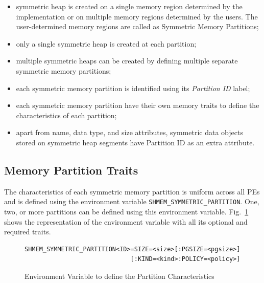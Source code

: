 \begin{itemize}
    \item symmetric heap is created on a single memory region
    determined by the implementation or on multiple memory regions
    determined by the users. The user-determined memory regions are
    called as Symmetric Memory Partitions;
    \item only a single symmetric heap is created at each partition;
    \item multiple symmetric heaps can be created by defining
    multiple separate symmetric memory partitions;
    \item each symmetric memory partition is identified using its
    \emph{Partition ID} label;
    \item each symmetric memory partition have their own memory
    traits to define the characteristics of each partition;
    \item apart from name, data type, and size attributes, symmetric
    data objects stored on symmetric heap segments have Partition ID
    as an extra attribute.
\end{itemize}

\subsection{Memory Partition Traits}
\label{src:smempart/traits}
The characteristics of each symmetric memory partition is uniform
across all PEs and is defined using the environment variable
\texttt{SHMEM\_SYMMETRIC\_PARTITION}. One, two, or more partitions
can be defined using this environment variable. Fig.~\ref{fig:env}
shows the representation of the %
environment variable with all its optional and required traits.

\begin{figure}
    \lstset{language=c,
            keywordstyle=\bfseries,
            basicstyle=\tt\small,
            frame=single}
    \vspace{-20pt}
    \begin{lstlisting}
SHMEM_SYMMETRIC_PARTITION<ID>=SIZE=<size>[:PGSIZE=<pgsize>]
                             [:KIND=<kind>:POLICY=<policy>]
    \end{lstlisting}
    \vspace{-10pt}
    \caption{Environment Variable to define the Partition
    Characteristics}
    \vspace{-20pt}
    \label{fig:env}
\end{figure}

